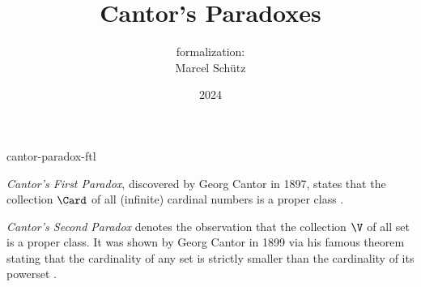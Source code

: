\documentclass{article}
\title{Cantor's Paradoxes}
\author{\Naproche formalization: \\[0.5em]Marcel Schütz}
\date{2024}
\begin{document}
\begin{smodule}{cantor-paradox-ftl}
  \maketitle


  \noindent \emph{Cantor's First Paradox}, discovered by Georg Cantor in 1897,
  states that the collection $\Card$ of all (infinite) cardinal numbers is a
  proper class \cite[chapter 156]{Cantor1991}.


  \emph{Cantor's Second Paradox} denotes the observation that the collection
  $\V$ of all set is a proper class.
  It was shown by Georg Cantor in 1899 via his famous theorem stating that the
  cardinality of any set is strictly smaller than the cardinality of its 
  powerset \cite[chapter 163]{Cantor1991}.


  \printbibliography
\end{smodule}
\end{document}
